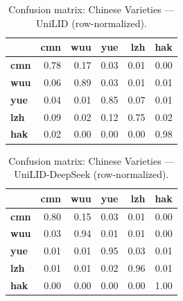 \begin{table}[htbp]
\centering
\small
\begin{tabular}{lrrrrr}
\toprule
 & \textbf{cmn} & \textbf{wuu} & \textbf{yue} & \textbf{lzh} & \textbf{hak} \\
\midrule
\textbf{cmn} & \cellcolor{blue!78}\color{white}0.78 & \cellcolor{blue!17}0.17 & \cellcolor{blue!3}0.03 & \cellcolor{blue!1}0.01 & \cellcolor{blue!0}0.00 \\
\textbf{wuu} & \cellcolor{blue!6}0.06 & \cellcolor{blue!88}\color{white}0.89 & \cellcolor{blue!2}0.03 & \cellcolor{blue!0}0.01 & \cellcolor{blue!1}0.01 \\
\textbf{yue} & \cellcolor{blue!4}0.04 & \cellcolor{blue!1}0.01 & \cellcolor{blue!85}\color{white}0.85 & \cellcolor{blue!7}0.07 & \cellcolor{blue!1}0.01 \\
\textbf{lzh} & \cellcolor{blue!8}0.09 & \cellcolor{blue!2}0.02 & \cellcolor{blue!11}0.12 & \cellcolor{blue!75}\color{white}0.75 & \cellcolor{blue!2}0.02 \\
\textbf{hak} & \cellcolor{blue!1}0.02 & \cellcolor{blue!0}0.00 & \cellcolor{blue!0}0.00 & \cellcolor{blue!0}0.00 & \cellcolor{blue!98}\color{white}0.98 \\
\bottomrule
\end{tabular}
\caption{Confusion matrix: Chinese Varieties — UniLID (row-normalized).}
\label{tab:cm-chinese_varieties-unilid}
\end{table}

\begin{table}[htbp]
\centering
\small
\begin{tabular}{lrrrrr}
\toprule
 & \textbf{cmn} & \textbf{wuu} & \textbf{yue} & \textbf{lzh} & \textbf{hak} \\
\midrule
\textbf{cmn} & \cellcolor{blue!80}\color{white}0.80 & \cellcolor{blue!14}0.15 & \cellcolor{blue!3}0.03 & \cellcolor{blue!1}0.01 & \cellcolor{blue!0}0.00 \\
\textbf{wuu} & \cellcolor{blue!2}0.03 & \cellcolor{blue!94}\color{white}0.94 & \cellcolor{blue!1}0.01 & \cellcolor{blue!1}0.01 & \cellcolor{blue!0}0.00 \\
\textbf{yue} & \cellcolor{blue!1}0.01 & \cellcolor{blue!1}0.01 & \cellcolor{blue!94}\color{white}0.95 & \cellcolor{blue!2}0.03 & \cellcolor{blue!0}0.01 \\
\textbf{lzh} & \cellcolor{blue!0}0.01 & \cellcolor{blue!0}0.01 & \cellcolor{blue!1}0.02 & \cellcolor{blue!96}\color{white}0.96 & \cellcolor{blue!0}0.01 \\
\textbf{hak} & \cellcolor{blue!0}0.00 & \cellcolor{blue!0}0.00 & \cellcolor{blue!0}0.00 & \cellcolor{blue!0}0.00 & \cellcolor{blue!100}\color{white}1.00 \\
\bottomrule
\end{tabular}
\caption{Confusion matrix: Chinese Varieties — UniLID-DeepSeek (row-normalized).}
\label{tab:cm-chinese_varieties-unilid-deepseek}
\end{table}

